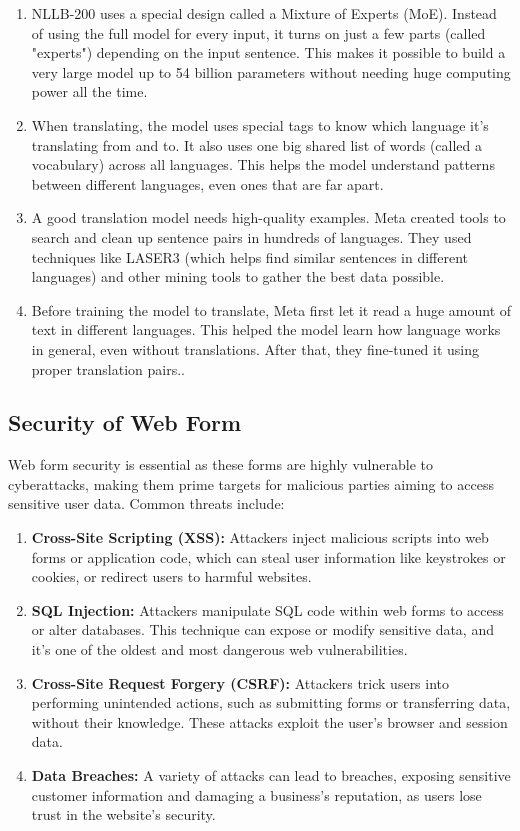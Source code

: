 \documentclass[12pt,oneside,openright,a4paper]{cpe-english-project}
\begin{document}
\begin{enumerate}
	\item NLLB-200 uses a special design called a Mixture of Experts (MoE). Instead of using the full model for every input, it turns on just a few parts (called "experts") depending on the input sentence. This makes it possible to build a very large model up to 54 billion parameters without needing huge computing power all the time.
	\item When translating, the model uses special tags to know which language it’s translating from and to. It also uses one big shared list of words (called a vocabulary) across all languages. This helps the model understand patterns between different languages, even ones that are far apart.
	
	\item A good translation model needs high-quality examples. Meta created tools to search and clean up sentence pairs in hundreds of languages. They used techniques like LASER3 (which helps find similar sentences in different languages) and other mining tools to gather the best data possible.
	\item Before training the model to translate, Meta first let it read a huge amount of text in different languages. This helped the model learn how language works in general, even without translations. After that, they fine-tuned it using proper translation pairs..
\end{enumerate}

\newpage

\subsection{Security of Web Form} Web form security is essential as these forms are highly vulnerable to cyberattacks, making them prime targets for malicious parties aiming to access sensitive user data. 
Common threats include:
\begin{enumerate}
	\item \textbf{Cross-Site Scripting (XSS):} Attackers inject malicious scripts into web forms or application code, which can steal user information like keystrokes or cookies, or redirect users to harmful websites.
	\item \textbf{SQL Injection:} Attackers manipulate SQL code within web forms to access or alter databases. This technique can expose or modify sensitive data, and it’s one of the oldest and most dangerous web vulnerabilities.
	\item \textbf{Cross-Site Request Forgery (CSRF):} Attackers trick users into performing unintended actions, such as submitting forms or transferring data, without their knowledge. These attacks exploit the user’s browser and session data.
	\item \textbf{Data Breaches:} A variety of attacks can lead to breaches, exposing sensitive customer information and damaging a business's reputation, as users lose trust in the website's security.
\end{enumerate}
\end{document}

